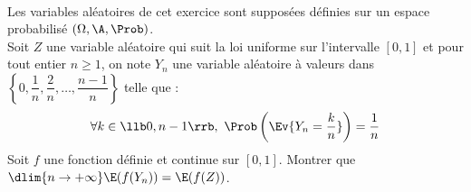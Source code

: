 
\begin{exerciceSP}~\\
Les variables aléatoires de cet exercice sont supposées définies sur un 
espace probabilisé $(\Omega,\A,\Prob)$.\\
Soit $Z$ une variable aléatoire qui suit la loi uniforme sur 
l'intervalle $[0,1]$ et pour tout entier $n\geq 1$, on note $Y_n$ une 
variable aléatoire à valeurs dans 
$\left\{0,\dfrac{1}{n},\dfrac{2}{n},\hdots, \dfrac{n-1}{n}\right\}$ 
telle que : 
\[
  \forall k\in\llb 0,n-1\rrb, \ 
  \Prob\left(\Ev{Y_n=\dfrac{k}{n}}\right)=\dfrac{1}{n}
\]
Soit $f$ une fonction définie et continue sur $[0,1]$. Montrer que 
$\dlim{n\to+\infty} \E(f(Y_n))=\E(f(Z))$.
\end{exerciceSP} 



